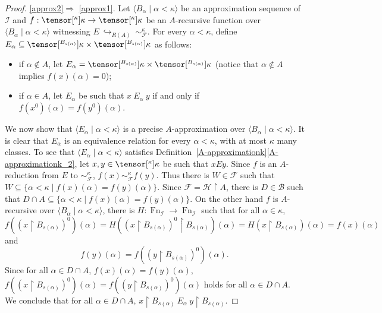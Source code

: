 \documentclass{amsart}
\numberwithin{equation}{section}
\newcommand{\I}{\mathcal{I}}
\newcommand{\pre}[2]{\tensor[^{#1}]{#2}{}}
\newcommand{\seq}[2]{\langle #1 \mid #2 \rangle}
\newcommand{\1}{\mathbf{I}}
\newcommand{\2}{\mathbf{II}}
\renewcommand{\a}{\alpha}
\renewcommand{\k}{\kappa}
\DeclareMathOperator{\Fn}{Fn}
\theoremstyle{definition}
\newtheorem{claim}{Claim}[theorem]
\theoremstyle{remark}
\begin{document}
\begin{proof}
\ref{approx2}$\Rightarrow$ \ref{approx1}.
Let $\seq{B_\alpha}{\alpha<\kappa}$ be an approximation sequence of $\mathcal{I}$ and $f:\pre{\k}{\kappa}\rightarrow\pre{\k}{\kappa}$ be an $A$-recursive function over $\seq{B_\alpha}{\alpha<\kappa}$ witnessing $E\ \hookrightarrow_{R(A)}\ \sim^\kappa_\mathcal{F}$. 
    For every $\alpha<\kappa$, define $E_\alpha\subseteq \pre{B_{s(\alpha)}}{\k}\times\pre{B_{s(\alpha)}}{\k}$ as follows:
    \begin{itemize}
        \item if $\alpha\notin A$, let $E_\alpha=\pre{B_{s(\alpha)}}{\k}\times\pre{B_{s(\alpha)}}{\k}$ (notice that $\alpha\notin A$ implies $f(x)(\alpha)=0$);
        \item if $\alpha\in A$, let \(E_\a\) be such that $x\ E_\alpha\ y$ if and only if $f(x^0)(\alpha)=f(y^0)(\alpha)$.
   \end{itemize}
     We now show that $\langle E_\alpha\mid \alpha<\kappa\rangle$ is a precise $A$-approximation over $\seq{B_\alpha}{\alpha<\kappa}$.
It is clear that $E_\alpha$ is an equivalence relation for every $\alpha<\k$, with at most $\k$ many classes. To see that $\langle E_\alpha\mid \alpha<\kappa\rangle$ satisfies Definition~\ref{A-approximationk}\ref{A-approximationk_2}, let $x,y\in\pre{\k}{\kappa}$  be such that $x Ey$. Since $f$ is an $A$-reduction from $E$ to $\sim^\kappa_\mathcal{F}$, $f(x)\sim^\kappa_\mathcal{F} f(y)$. Thus there is $W\in \mathcal{F}$ such that $W\subseteq \{\alpha<\kappa\mid f(x)(\alpha)= f(y)(\alpha)\}$. 
Since $\mathcal{F}=\mathcal{H}\restriction A$, there is $D\in \mathcal{B}$ such that $D\cap A\subseteq\{\alpha<\kappa\mid f(x)(\alpha)= f(y)(\alpha)\}$.
On the other hand $f$ is $A$-recursive over $\seq{B_\alpha}{\alpha<\kappa}$, there is $H:\Fn_{\I}\rightarrow \Fn_{\I}$ such that for all $\alpha\in \kappa$, $$f((x\restriction B_{s(\alpha)})^0)(\alpha)=H((x\restriction B_{s(\alpha)})^0\restriction B_{s(\alpha)})(\alpha)=H(x\restriction B_{s(\alpha)})(\alpha)=f(x)(\alpha)$$ and $$f(y)(\alpha)=f((y\restriction B_{s(\alpha)})^0)(\alpha).$$ 
Since for all $\alpha\in D\cap A$, $f(x)(\alpha)=f(y)(\alpha)$, $f((x\restriction B_{s(\alpha)})^0)(\alpha)=f((y\restriction B_{s(\alpha)})^0)(\alpha)$ holds for all $\alpha\in D\cap A$. We conclude that for all $\alpha\in D\cap A$, $x\restriction B_{s(\alpha)}\ E_\alpha\ y\restriction B_{s(\alpha)}$. 


\end{proof}
\end{document}
